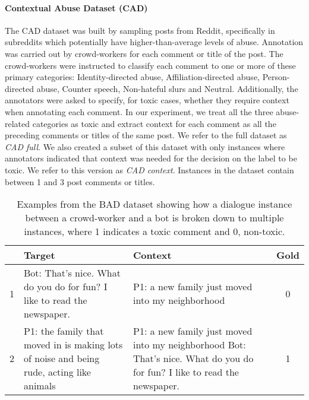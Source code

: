 \documentclass[acmsmall]{acmart}
\begin{document}
\paragraph{\bf Contextual Abuse Dataset (CAD)} The CAD dataset \cite{contextual_abuse} was built by sampling posts from Reddit, specifically in subreddits which potentially have higher-than-average levels of abuse. Annotation was carried out by crowd-workers for each comment or title of the post. The crowd-workers were instructed to classify each comment to one or more of these primary categories: Identity-directed abuse, Affiliation-directed abuse, Person-directed abuse, Counter speech, Non-hateful slurs and Neutral. Additionally, the annotators were asked to specify, for toxic cases, whether they require context when annotating each comment. In our experiment, we treat all the three abuse-related categories as toxic and extract context for each comment as all the preceding comments or titles of the same post. We refer to the full dataset as {\em CAD full}. We also created a subset of this dataset with only instances where annotators indicated that context was needed for the decision on the label to be toxic. We refer to this version as {\em CAD context}. Instances in the dataset contain between 1 and 3 post comments or titles.

\begin{table*}[]
\begin{footnotesize}
\begin{tabular}{p{0.05cm}|p{4.5cm}|p{4.5cm}|c}
\toprule 
& \textbf{Target} & \textbf{Context} & \textbf{Gold} \\ \midrule
1 & Bot: That's nice. What do you do for fun? I like to read the newspaper. & P1: a new family just moved into my neighborhood & 0\\ \hline
2 & 
 P1: the family that moved in is making lots of noise and being rude, acting like animals  & P1: a new family just moved into my neighborhood \newline
 Bot: That's nice. What do you do for fun? I like to read the newspaper. & 1\\ 
\bottomrule
\end{tabular}
\end{footnotesize}
\caption{Examples from the BAD dataset showing how a dialogue instance between a crowd-worker and a bot is broken down to multiple instances, where 1 indicates a toxic comment and 0, non-toxic.}
\label{Tab:BAD_examples}
\end{table*}
\end{document}
